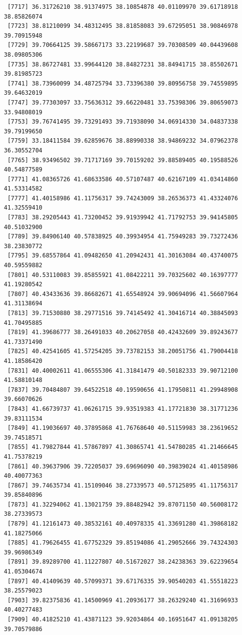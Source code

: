 \documentclass[
  letterpaper,
  DIV=11,
  numbers=noendperiod]{scrartcl}
\begin{document}
\begin{verbatim}
 [7717] 36.31726210 38.91374975 38.10854878 40.01109970 39.61718918 38.85826074
 [7723] 38.81210099 34.48312495 38.81858083 39.67295051 38.90846978 39.70915948
 [7729] 39.70664125 39.58667173 33.22199687 39.70308509 40.04439608 38.09805306
 [7735] 38.86727481 33.99644120 38.84827231 38.84941715 38.85502671 39.81985723
 [7741] 38.73960099 34.48725794 33.73396380 39.80956758 39.74559895 39.64632019
 [7747] 39.77303097 33.75636312 39.66220481 33.75398306 39.80659073 33.94808019
 [7753] 39.76741495 39.73291493 39.71938090 34.06914330 34.04837338 39.79199650
 [7759] 33.18411584 39.62859676 38.88990338 38.94869232 34.07962378 36.30552704
 [7765] 38.93496502 39.71717169 39.70159202 39.88589405 40.19588526 40.54877589
 [7771] 41.08365726 41.68633586 40.57107487 40.62167109 41.03414860 41.53314582
 [7777] 41.40158986 41.11756317 39.74243009 38.26536373 41.43324076 41.32559410
 [7783] 38.29205443 41.73200452 39.91939942 41.71792753 39.94145805 40.51032900
 [7789] 39.84906140 40.57838925 40.39934954 41.75949283 39.73272436 38.23830772
 [7795] 39.68557864 41.09482650 41.20942431 41.30163084 40.43740075 40.59559882
 [7801] 40.53110083 39.85855921 41.08422211 39.70325602 40.16397777 41.19280542
 [7807] 40.43433636 39.86682671 41.65548924 39.90694096 41.56607964 41.31138694
 [7813] 39.71530880 38.29771516 39.74145492 41.30416714 40.38845093 41.70495885
 [7819] 41.39686777 38.26491033 40.20627058 40.42432609 39.89243677 41.73371490
 [7825] 40.42541605 41.57254205 39.73782153 38.20051756 41.79004418 41.18586420
 [7831] 40.40002611 41.06555306 41.31841479 40.50182333 39.90712100 41.58810148
 [7837] 39.70484807 39.64522518 40.19590656 41.17950811 41.29948908 39.66070626
 [7843] 41.66739737 41.06261715 39.93519383 41.17721830 38.31771236 39.83111534
 [7849] 41.19036697 40.37895868 41.76768640 40.51159983 38.23619652 39.74518571
 [7855] 41.79827844 41.57867897 41.30865741 41.54780285 41.21466645 41.75378219
 [7861] 40.39637906 39.72205037 39.69696090 40.39839024 41.40158986 40.40077363
 [7867] 39.74635734 41.15109046 38.27339573 40.57125895 41.11756317 39.85840896
 [7873] 41.32294062 41.13021759 39.88482942 39.87071150 40.56008172 38.27339573
 [7879] 41.12161473 40.38532161 40.40978335 41.33691280 41.39868182 41.18275066
 [7885] 41.79626455 41.67752329 39.85194086 41.29052666 39.74324303 39.96986349
 [7891] 39.89289700 41.11227807 40.51672027 38.24238363 39.62239654 41.05304674
 [7897] 40.41409639 40.57099371 39.67176335 39.90540203 41.55518223 38.25579023
 [7903] 39.82375836 41.14500969 41.20936177 38.26329240 41.31696933 40.40277483
 [7909] 40.41825210 41.43871123 39.92034864 40.16951647 41.09138205 39.70579886

\end{verbatim}
\end{document}
